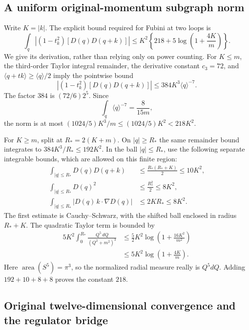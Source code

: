 \subsection{A uniform original-momentum subgraph norm}

Write $K=|k|$. The explicit bound required for Fubini at two loops is
\[
 \int_q\left|(1-t_k^2)[D(q)D(q+k)]\right|
 \le K^2\left\{218+5\log\left(1+\frac{4K}{m}\right)\right\}.
\]
We give its derivation, rather than relying only on power counting.
For $K\le m$, the third-order Taylor integral remainder, the derivative
constant $c_3=72$, and
$\langle q+tk\rangle\ge\langle q\rangle/2$ imply the pointwise bound
\[
 \left|(1-t_k^2)[D(q)D(q+k)]\right|
       \le384K^3\langle q\rangle^{-7}.
\]
The factor $384$ is $(72/6)2^5$. Since
\[
 \int_q\langle q\rangle^{-7}=\frac8{15m},
\]
the norm is at most $(1024/5)K^3/m\le(1024/5)K^2<218K^2$.

For $K\ge m$, split at $R_*=2(K+m)$. On $|q|\ge R_*$ the same remainder
bound integrates to
$384K^3/R_*\le192K^2$. In the ball $|q|\le R_*$, use the following
separate integrable bounds, which are allowed on this finite region:
\begin{align*}
 \int_{|q|\le R_*}D(q)D(q+k)
 &\le\frac{R_*(R_*+K)}2\le10K^2,\\
 \int_{|q|\le R_*}D(q)^2&\le\frac{R_*^2}{2}\le8K^2,\\
 \int_{|q|\le R_*}|D(q)\,k\cdot\nabla D(q)|
 &\le2KR_*\le8K^2.
\end{align*}
The first estimate is Cauchy--Schwarz, with the shifted ball enclosed in
radius $R_*+K$. The quadratic Taylor term is bounded by
\begin{align*}
 5K^2\int_0^{R_*}\frac{Q^5\,dQ}{(Q^2+m^2)^3}
 &\le\frac52K^2\log\left(1+\frac{16K^2}{m^2}\right)\\
 &\le5K^2\log\left(1+\frac{4K}{m}\right).
\end{align*}
Here $\operatorname{area}(S^5)=\pi^3$, so the normalized radial measure
really is $Q^5dQ$. Adding $192+10+8+8$ proves the constant $218$.

\subsection{Original twelve-dimensional convergence and the regulator bridge}

